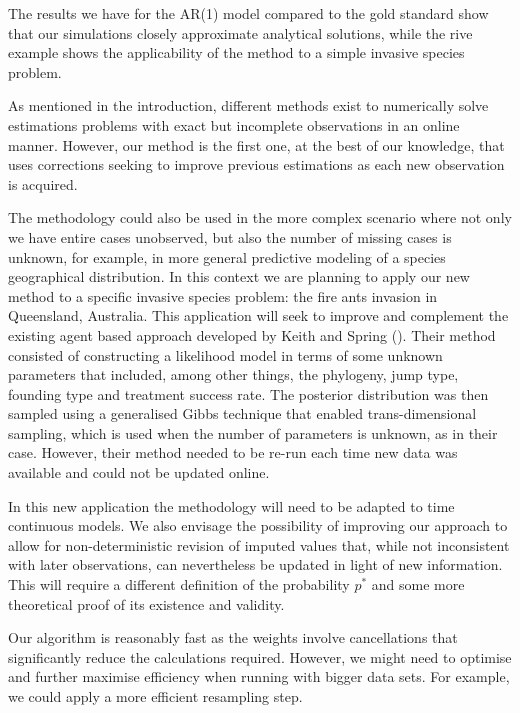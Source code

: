The results we have for the AR(1) model compared to the gold standard show that our simulations closely approximate analytical solutions, while the rive example shows the applicability of the method to a simple invasive species problem.

As mentioned in the introduction, different methods exist to numerically solve estimations problems with exact but incomplete observations in an online manner. However, our method is the first one, at the best of our knowledge, that uses corrections seeking to improve previous estimations as each new observation is acquired.

The methodology could also be used in the more complex scenario where not only we have entire cases unobserved, but also the number of missing cases is unknown, for example, in more general predictive modeling of a species geographical distribution. In this context we are planning to apply our new method to a specific invasive species problem: the fire ants invasion in Queensland, Australia. This application will seek to improve and complement the existing agent based approach developed by Keith and Spring (\cite{Keith}). Their method consisted of constructing a likelihood model in terms of some unknown parameters that included, among other things, the phylogeny, jump type, founding type and treatment success rate. The posterior distribution was then sampled using a generalised Gibbs technique that enabled trans-dimensional sampling, which is used when the number of parameters is unknown, as in their case. However, their method needed to be re-run each time new data was available and could not be updated online.

In this new application the methodology will need to be adapted to time continuous models. We also envisage the possibility of improving our approach to allow for non-deterministic revision of imputed values that, while not inconsistent with later observations, can nevertheless be updated in light of new information. This will require a different definition of the probability $p^*$ and some more theoretical proof of its existence and validity. 

Our algorithm is reasonably fast as the weights involve cancellations that significantly reduce the calculations required. However, we might need to optimise and further maximise efficiency when running with bigger data sets. For example, we could apply a more efficient resampling step.




